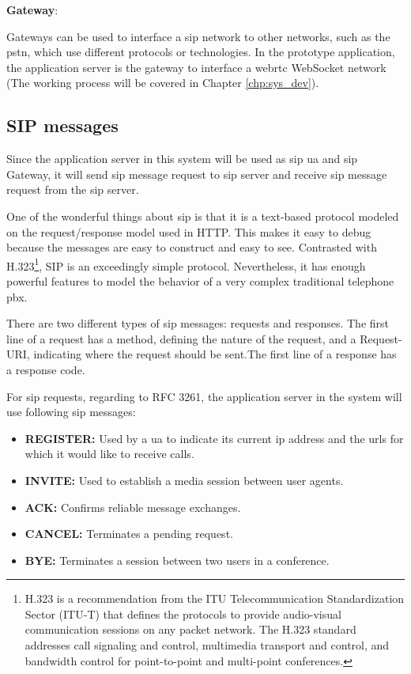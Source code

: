 \noindent \textbf{Gateway}\cite{wiki:sip}:
\par Gateways can be used to interface a \gls{sip} network to other networks, such as the \gls{pstn}, which use different protocols or technologies. In the prototype application, the application server is the gateway to interface a \gls{webrtc} WebSocket network (The working process will be covered in Chapter \ref{chp:sys_dev}).

\subsection{SIP messages}
\noindent Since the application server in this system will be used as \gls{sip} \gls{ua} and \gls{sip} Gateway, it will send \gls{sip} message request to \gls{sip} server and receive \gls{sip} message request from the \gls{sip} server.

\par One of the wonderful things about \gls{sip} is that it is a text-based protocol modeled on the request/response model used in HTTP.  This makes it easy to debug because the messages are easy to construct and easy to see.  Contrasted with H.323\footnote{H.323 is a recommendation from the ITU Telecommunication Standardization Sector (ITU-T) that defines the protocols to provide audio-visual communication sessions on any packet network. The H.323 standard addresses call signaling and control, multimedia transport and control, and bandwidth control for point-to-point and multi-point conferences.\cite{wiki:h323}}, SIP is an exceedingly simple protocol.  Nevertheless, it has enough powerful features to model the behavior of a very complex traditional telephone \gls{pbx}.\cite{networkworld:sip}

\par There are two different types of \gls{sip} messages: requests and responses. The first line of a request has a method, defining the nature of the request, and a Request-URI, indicating where the request should be sent.The first line of a response has a response code.

\noindent For sip requests, regarding to RFC 3261\cite{rfc:3261}, the application server in the system will use following \gls{sip} messages:

\begin{itemize}[topsep=-1em,parsep=0em,itemsep=0em]
 \item \textbf{REGISTER:} Used by a \gls{ua} to indicate its current \gls{ip} address and the \gls{url}s for which it would like to receive calls.
 \item \textbf{INVITE:} Used to establish a media session between user agents.
 \item \textbf{ACK:} Confirms reliable message exchanges.
 \item \textbf{CANCEL:} Terminates a pending request.
 \item \textbf{BYE:} Terminates a session between two users in a conference.
\end{itemize}

